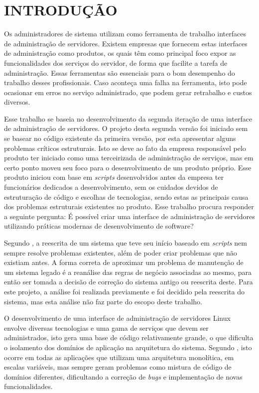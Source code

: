 \chapter{INTRODUÇÃO}
\label{chp:intro}

Os administradores de sistema utilizam como ferramenta de trabalho interfaces
de administração de servidores. Existem empresas que fornecem estas interfaces
de administração como produtos, os quais têm como principal foco expor as
funcionalidades dos serviços do servidor, de forma que facilite a tarefa de
administração. Essas ferramentas são essenciais para o bom desempenho do
trabalho desses profissionais. Caso aconteça uma falha na ferramenta, isto
pode ocasionar em erros no serviço administrado, que podem gerar retrabalho
e custos diversos.

Esse trabalho se baseia no desenvolvimento da segunda iteração de uma
interface de administração de servidores. O projeto desta segunda versão
foi iniciado sem se basear no código existente da primeira versão, por esta
apresentar alguns problemas críticos estruturais. Isto se deve ao fato da
empresa responsável pelo produto ter iniciado como uma terceirizada de
administração de serviços, mas em certo ponto moveu seu foco para o
desenvolvimento de um produto próprio. Esse produto iniciou com base em
\emph{scripts} desenvolvidos antes da empresa ter funcionários dedicados a
desenvolvimento, sem os cuidados devidos de estruturação de código e escolhas
de tecnologias, sendo estas as principais causa dos problemas estruturais
existentes no produto. Esse trabalho procura responder a seguinte pergunta:
É possível criar uma interface de administração de servidores utilizando
práticas modernas de desenvolvimento de software?

Segundo , a reescrita de um sistema que teve seu
início baseado em \emph{scripts} nem sempre resolve problemas existentes,
além de poder criar problemas que não existiam antes. A forma correta de
aproximar um problema de manutenção de um sistema legado é a reanálise das
regras de negócio associadas ao mesmo, para então ser tomada a decisão de
correção do sistema antigo ou reescrita deste. Para este projeto, a análise
foi realizada previamente e foi decidido pela reescrita do sistema, mas esta
análise não faz parte do escopo deste trabalho.

O desenvolvimento de uma interface de administração de servidores Linux
envolve diversas tecnologias e uma gama de serviços que devem ser
administrados, isto gera uma base de código relativamente grande, o que
dificulta o isolamento dos domínios de aplicação na arquitetura
do sistema. Segundo , isto ocorre em todas as aplicações
que utilizam uma arquitetura monolítica, em escalas variáveis, mas sempre
geram problemas como mistura de código de domínios diferentes, dificultando
a correção de \emph{bugs} e implementação de novas funcionalidades.

